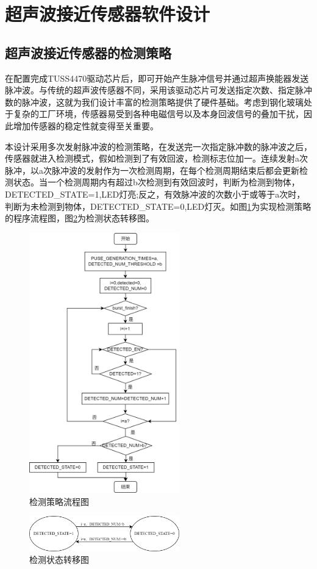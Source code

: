 \newpage
\section{超声波接近传感器软件设计}
\subsection{超声波接近传感器的检测策略}
在配置完成TUSS4470驱动芯片后，即可开始产生脉冲信号并通过超声换能器发送脉冲波。与传统的超声波传感器不同，采用该驱动芯片可发送指定次数、指定脉冲数的脉冲波，这就为我们设计丰富的检测策略提供了硬件基础。考虑到钢化玻璃处于复杂的工厂环境，传感器易受到各种电磁信号以及本身回波信号的叠加干扰，因此增加传感器的稳定性就变得至关重要。\par

本设计采用多次发射脉冲波的检测策略，在发送完一次指定脉冲数的脉冲波之后，传感器就进入检测模式，假如检测到了有效回波，检测标志位加一。连续发射a次脉冲，以a次脉冲波的发射作为一次检测周期，在每个检测周期结束后都会更新检测状态。当一个检测周期内有超过b次检测到有效回波时，判断为检测到物体，DETECTED\_STATE=1,LED灯亮;反之，有效脉冲波的次数小于或等于a次时，判断为未检测到物体，DETECTED\_STATE=0,LED灯灭。如图\ref{检测策略流程图}为实现检测策略的程序流程图，图\ref{检测状态转移图}为检测状态转移图。
\begin{figure}[!h]
	\centering
	\includegraphics[width=6.5cm]{figure/detection logic.png}
	\caption{检测策略流程图}
	\label{检测策略流程图}%
\end{figure}
\begin{figure}[!h]
	\centering
	\includegraphics[width=6.5cm]{figure/LED state transition diagram.png}
	\caption{检测状态转移图}
	\label{检测状态转移图}%
\end{figure}\par


